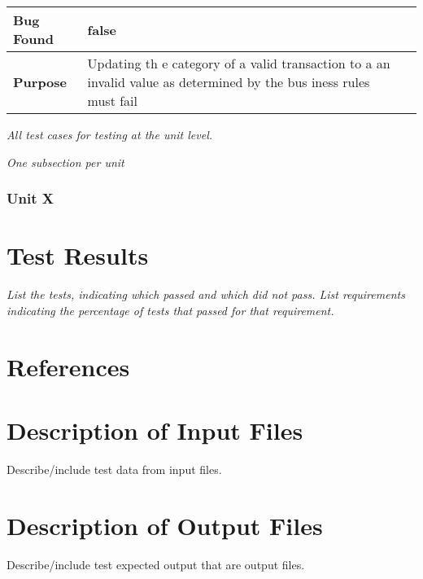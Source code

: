 \documentclass[12pt]{article}
\newcounter{req ID}
\begin{document}
\begin{longtable}{|m{4cm}|l|l|l|}
\cellcolor[HTML]{C0C0C0}\textbf{Bug Found} & \multicolumn{2}{p{13cm}|}{false}\\
\hline
\cellcolor[HTML]{C0C0C0}\textbf{Purpose} & \multicolumn{2}{p{13cm}|}{Updating th
e category of a valid transaction to a an invalid value as determined by the bus
iness rules must fail}\\ \hline
\end{longtable}


{\it
All test cases for testing at the unit level.
}

{\it
One subsection per unit
}

\subsubsection{Unit X}

\section{Test Results}

{\it
List the tests, indicating which passed and which did not pass.
List requirements indicating the percentage of tests that passed for that requirement.
}

\section{References}

\appendix

\section{Description of Input Files}

Describe/include test data from input files.

\section{Description of Output Files}

Describe/include test expected output that are output files.
\end{document}
